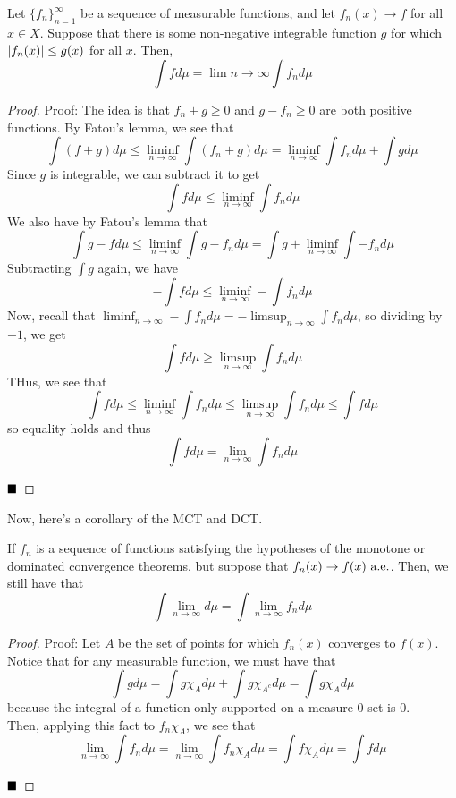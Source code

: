 \begin{theorem}
    Let $\{f_n\}_{n = 1}^{\infty}$ be a sequence of measurable functions, and let $f_n(x) \to f$ for all $x \in X$. Suppose that there is some non-negative integrable function $g$ for which $\abs{f_n(x)} \leq g(x)$ for all $x$. Then, 
    \[ \int f d\mu = \lim{n \to \infty} \int f_nd\mu \]
\end{theorem}
\begin{proof}{Proof:}
    The idea is that $f_n + g \geq 0$ and $g - f_n \geq 0$ are both positive functions. By Fatou's lemma, we see that
    \[ \int (f + g)d\mu \leq \liminf_{n \to \infty} \int (f_n + g) d\mu = \liminf_{n \to \infty} \int f_n d\mu + \int g d\mu \]
    Since $g$ is integrable, we can subtract it to get
    \[ \int f d\mu \leq \liminf_{n \to \infty} \int f_n d\mu \]
    We also have by Fatou's lemma that
    \[ \int g - f d\mu \leq \liminf_{n \to \infty} \int g - f_n d\mu = \int g + \liminf_{n \to \infty} \int -f_n d\mu \]
    Subtracting $\int g$ again, we have
    \[ -\int f d\mu \leq \liminf_{n \to \infty} -\int f_nd\mu \]
    Now, recall that $\liminf_{n \to \infty} -\int f_n d\mu = -\limsup_{n \to \infty} \int f_n d\mu$, so dividing by $-1$, we get
    \[ \int f d\mu \geq \limsup_{n \to \infty} \int f_n d\mu \]
    THus, we see that
    \[ \int f d\mu \leq \liminf_{n \to \infty} \int f_n d\mu \leq \limsup_{n \to \infty} \int f_n d\mu \leq \int f d \mu \]
    so equality holds and thus
    \[ \int f d\mu = \lim_{n \to \infty} \int f_n d\mu \]

    $\qed$
\end{proof}

Now, here's a corollary of the MCT and DCT.

\begin{lemma}
    If $f_n$ is a sequence of functions satisfying the hypotheses of the monotone or dominated convergence theorems, but suppose that $f_{n}(x) \to f(x) \tt{ a.e.}$. Then, we still have that
    \[ \int \lim_{n \to \infty} d\mu = \int \lim_{n \to \infty} f_n d\mu \]
\end{lemma}
\begin{proof}{Proof:}
    Let $A$ be the set of points for which $f_n(x)$ converges to $f(x)$. Notice that for any measurable function, we must have that
    \[ \int g d\mu = \int g\chi_{A} d\mu + \int g\chi_{A^{c}}d\mu = \int g \chi_{A}d\mu \]
    because the integral of a function only supported on a measure 0 set is 0.\\

    Then, applying this fact to $f_{n}\chi_{A}$, we see that
    \[ \lim_{n \to \infty} \int f_nd\mu = \lim_{n \to \infty} \int f_n\chi_{A}d\mu = \int f \chi_{A}d\mu = \int f d\mu \]

    $\qed$
\end{proof}


